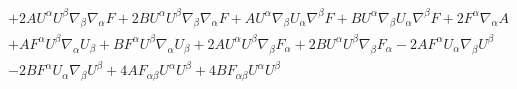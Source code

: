 \documentclass[10pt,letterpaper]{article}
\numberwithin{equation}{section}
\begin{document}
\begin{eqnarray}
&& + 2 A U^{\alpha } U^{\beta } \nabla_{\beta }\nabla_{\alpha }F + 2 B U^{\alpha } U^{\beta } \nabla_{\beta }\nabla_{\alpha }F + A U^{\alpha } \nabla_{\beta }U_{\alpha } \nabla^{\beta }F + B U^{\alpha } \nabla_{\beta }U_{\alpha } \nabla^{\beta }F+2 F^{\alpha } \nabla_{\alpha }A \nonumber \\ 
&& + A F^{\alpha } U^{\beta } \nabla_{\alpha }U_{\beta } + B F^{\alpha } U^{\beta } \nabla_{\alpha }U_{\beta } + 2 A U^{\alpha } U^{\beta } \nabla_{\beta }F_{\alpha } + 2 B U^{\alpha } U^{\beta } \nabla_{\beta }F_{\alpha } - 2 A F^{\alpha } U_{\alpha } \nabla_{\beta }U^{\beta } \nonumber \\ 
&& - 2 B F^{\alpha } U_{\alpha } \nabla_{\beta }U^{\beta }+4 A F_{\alpha \beta } U^{\alpha } U^{\beta } + 4 B F_{\alpha \beta } U^{\alpha } U^{\beta }
\end{eqnarray}
%
%
%
\end{document}
